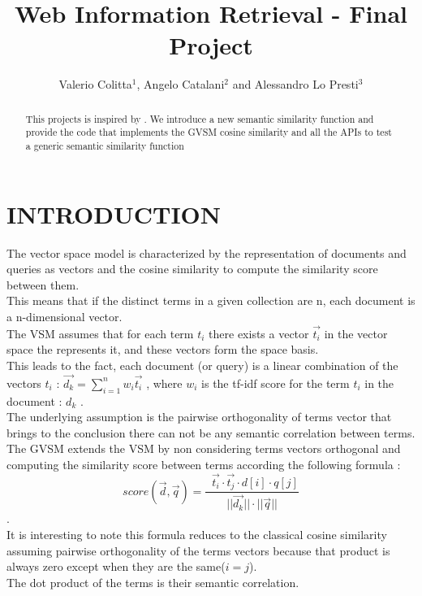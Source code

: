 \documentclass[letterpaper, 10 pt, conference]{ieeeconf}  %
\title{\LARGE \bf
Web Information Retrieval - Final Project
}
\author{Valerio Colitta$^{1}$, Angelo Catalani$^{2}$ and Alessandro Lo Presti$^{3}$}%
\begin{document}
\maketitle
\thispagestyle{empty}
\pagestyle{empty}


\begin{abstract}

This projects is inspired by \cite{c1}. We introduce a new semantic similarity function and provide the code that implements the GVSM cosine similarity and all the APIs to test a generic semantic similarity function


\end{abstract}


\section{INTRODUCTION}

The vector space model is characterized by the representation of documents and queries as vectors and the cosine similarity to compute the similarity score between them.\\This means that if the distinct terms in a given collection are n, each document is a n-dimensional vector.\\The VSM assumes that for each term $t_i$ there exists a vector $\vec{t_i}$ in the vector space the represents it, and these vectors form the space basis.\\This leads to the fact, each document (or query) is a linear combination of the vectors $t_i$ : $\vec{d_k} = \sum\limits_{i=1}^n w_i\vec{t_i}$ , where $w_i$ is the tf-idf score for the term $t_i$ in the document : $d_k$  .\\The underlying assumption is the pairwise orthogonality of terms vector that brings to the conclusion there can not be any semantic correlation between terms.\\The GVSM extends the VSM by non considering terms vectors orthogonal and computing the similarity score between terms according the following formula : 
\begin{equation}
    score(\vec{d},\vec{q}) = \frac{\mathop{\sum_{j=1}^{n'}\sum_{i=1}^{n'}}\vec{t_i}\cdot\vec{t_j}\cdot d[i]\cdot q[j] }{||\vec{d_k} ||\cdot||\vec{q} ||}
\end{equation}.\\It is interesting to note this formula reduces to the classical cosine similarity assuming pairwise orthogonality of the terms vectors because that product is always zero except when they are the same($i=j$).\\The dot product of the terms is their semantic correlation.
\end{document}
